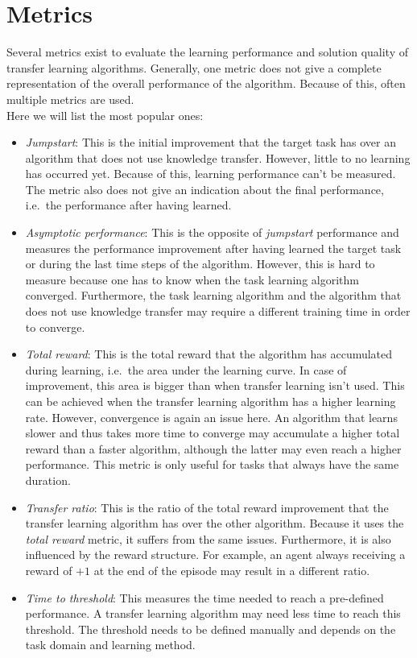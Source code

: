 \section{Metrics}
\label{sub:tl_metrics}
Several metrics exist to evaluate the learning performance and solution quality of transfer learning algorithms. Generally, one metric does not give a complete representation of the overall performance of the algorithm. Because of this, often multiple metrics are used.\\
Here we will list the most popular ones:
\begin{itemize}
    \item \textit{Jumpstart}: This is the initial improvement that the target task has over an algorithm that does not use knowledge transfer. However, little to no learning has occurred yet. Because of this, learning performance can't be measured. The metric also does not give an indication about the final performance, i.e.\ the performance after having learned.
    \item \textit{Asymptotic performance}: This is the opposite of \textit{jumpstart} performance and measures the performance improvement after having learned the target task or during the last time steps of the algorithm. However, this is hard to measure because one has to know when the task learning algorithm converged. Furthermore, the task learning algorithm and the algorithm that does not use knowledge transfer may require a different training time in order to converge.
    \item \textit{Total reward}: This is the total reward that the algorithm has accumulated during learning, i.e.\ the area under the learning curve. In case of improvement, this area is bigger than when transfer learning isn't used. This can be achieved when the transfer learning algorithm has a higher learning rate.
    However, convergence is again an issue here. An algorithm that learns slower and thus takes more time to converge may accumulate a higher total reward than a faster algorithm, although the latter may even reach a higher performance. This metric is only useful for tasks that always have the same duration.
    \item \textit{Transfer ratio}: This is the ratio of the total reward improvement that the transfer learning algorithm has over the other algorithm. Because it uses the \textit{total reward} metric, it suffers from the same issues. Furthermore, it is also influenced by the reward structure. For example, an agent always receiving a reward of $+1$ at the end of the episode may result in a different ratio.
    \item \textit{Time to threshold}: This measures the time needed to reach a pre-defined performance. A transfer learning algorithm may need less time to reach this threshold. The threshold needs to be defined manually and depends on the task domain and learning method.
\end{itemize}
